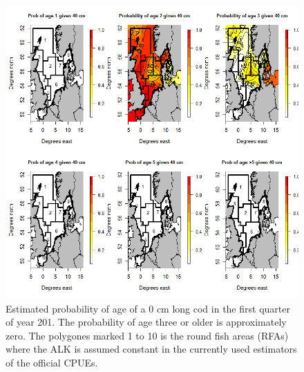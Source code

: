 \documentclass[a4paper 12pt]{article}
\numberwithin{equation}{section}
\begin{document}
\begin{figure}[h!]
\centering
\includegraphics[scale=0.4]{Allcode40cm2015.png}
\caption{Estimated probability of age of a 0 cm long cod in the first quarter of year 201. The probability of age three or older is approximately zero. The polygones marked 1 to 10 is the round fish areas (RFAs) where the ALK is assumed constant in the currently used estimators of the official CPUEs.}\label{fig:40cmCod2015}
\end{figure}
\end{document}
